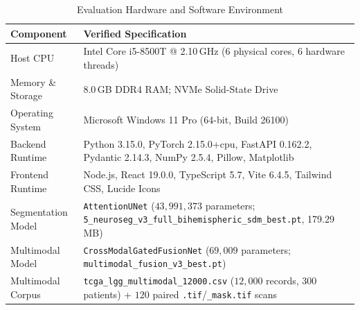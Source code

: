 \documentclass[conference]{IEEEtran}
\begin{document}
\begin{table}[t]
\centering
\caption{Evaluation Hardware and Software Environment}
\label{tab:env}
\begin{tabular}{@{}L{2.35cm}L{5.95cm}@{}}
\toprule
\textbf{Component} & \textbf{Verified Specification} \\
\midrule
Host CPU & Intel Core i5-8500T @ 2.10\,GHz (6 physical cores, 6 hardware threads) \\
Memory \& Storage & 8.0\,GB DDR4 RAM; NVMe Solid-State Drive \\
Operating System & Microsoft Windows 11 Pro (64-bit, Build 26100) \\
Backend Runtime & Python 3.15.0, PyTorch 2.15.0+cpu, FastAPI 0.162.2, Pydantic 2.14.3, NumPy 2.5.4, Pillow, Matplotlib \\
Frontend Runtime & Node.js, React 19.0.0, TypeScript 5.7, Vite 6.4.5, Tailwind CSS, Lucide Icons \\
Segmentation Model & \texttt{AttentionUNet} ($43,991,373$ parameters; \texttt{5\_neuroseg\_v3\_full\_bihemispheric\_sdm\_best.pt}, 179.29\,MB) \\
Multimodal Model & \texttt{CrossModalGatedFusionNet} ($69,009$ parameters; \texttt{multimodal\_fusion\_v3\_best.pt}) \\
Multimodal Corpus & \texttt{tcga\_lgg\_multimodal\_12000.csv} ($12,000$ records, $300$ patients) + $120$ paired \texttt{.tif}/\texttt{\_mask.tif} scans \\
\bottomrule
\end{tabular}
\end{table}
\end{document}
